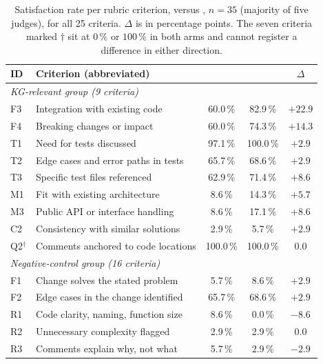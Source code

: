 \begin{table}[htbp]
    \centering
    \caption{Satisfaction rate per rubric criterion, \baseline{} versus \kg{},
             $n = 35$ (majority of five judges), for all 25 criteria. $\Delta$ is
             in percentage points. The seven criteria marked $\dagger$ sit at $0\,\%$ or
             $100\,\%$ in both arms and cannot register a difference in either
             direction.}
    \label{tab:exp1-criteria}
    \small
    \begin{tabular}{llccc}
        \toprule
        ID & Criterion (abbreviated) & \baseline{} & \kg{} & $\Delta$ \\
        \midrule
        \multicolumn{5}{l}{\emph{KG-relevant group (9 criteria)}} \\
        F3 & Integration with existing code       & 60.0\,\%  & 82.9\,\%  & $+22.9$ \\
        F4 & Breaking changes or impact           & 60.0\,\%  & 74.3\,\%  & $+14.3$ \\
        T1 & Need for tests discussed             & 97.1\,\%  & 100.0\,\% & $+2.9$ \\
        T2 & Edge cases and error paths in tests  & 65.7\,\%  & 68.6\,\%  & $+2.9$ \\
        T3 & Specific test files referenced       & 62.9\,\%  & 71.4\,\%  & $+8.6$ \\
        M1 & Fit with existing architecture       & 8.6\,\%   & 14.3\,\%  & $+5.7$ \\
        M3 & Public API or interface handling     & 8.6\,\%   & 17.1\,\%  & $+8.6$ \\
        C2 & Consistency with similar solutions   & 2.9\,\%   & 5.7\,\%   & $+2.9$ \\
        Q2$^{\dagger}$ & Comments anchored to code locations & 100.0\,\% & 100.0\,\% & $0.0$ \\
        \midrule
        \multicolumn{5}{l}{\emph{Negative-control group (16 criteria)}} \\
        F1 & Change solves the stated problem     & 5.7\,\%   & 8.6\,\%   & $+2.9$ \\
        F2 & Edge cases in the change identified  & 65.7\,\%  & 68.6\,\%  & $+2.9$ \\
        R1 & Code clarity, naming, function size  & 8.6\,\%   & 0.0\,\%   & $-8.6$ \\
        R2 & Unnecessary complexity flagged       & 2.9\,\%   & 2.9\,\%   & $0.0$ \\
        R3 & Comments explain why, not what       & 5.7\,\%   & 2.9\,\%   & $-2.9$ \\

\end{tabular}
\end{table}
